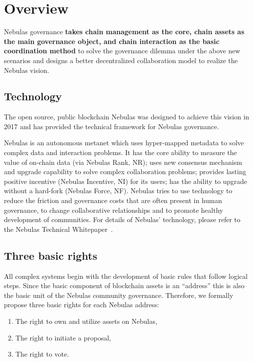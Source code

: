 \section{Overview}

Nebulas governance \textbf{takes chain management as the core, chain assets as the main governance object, and chain interaction as the basic coordination method} to solve the governance dilemma under the above new scenarios and designs a better decentralized collaboration model to realize the Nebulas vision.

\subsection{Technology}

The open source, public blockchain Nebulas was designed to achieve this vision in 2017 and has provided the technical framework for Nebulas governance.

Nebulas is an autonomous metanet which uses hyper-mapped metadata to solve complex data and interaction problems. It has the core ability to measure the value of on-chain data (via Nebulas Rank, NR); uses new consensus mechanism and upgrade capability to solve complex collaboration problems; provides lasting positive incentive (Nebulas Incentive, NI) for its users; has the ability to upgrade without a hard-fork (Nebulas Force, NF). Nebulas tries to use technology to reduce the friction and governance costs that are often present in human governance, to change collaborative relationships and to promote healthy development of communities. For details of Nebulas' technology, please refer to the Nebulas Technical Whitepaper~\cite{TechWhitepaper}.


\subsection{Three basic rights}
\label{rights}

All complex systems begin with the development of basic rules that follow logical steps. Since the basic component of blockchain assets is an “address” this is also the basic unit of the Nebulas community governance. Therefore, we formally propose three basic rights for each Nebulas address:

\begin{enumerate}
	\item The right to own and utilize assets on Nebulas,
	\item The right to initiate a proposal,
	\item The right to vote.
\end{enumerate}

